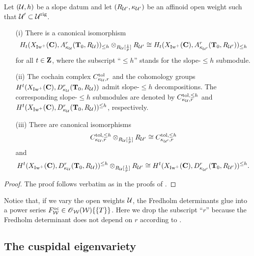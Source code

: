 \begin{Proposition}\label{Proposition: functoriality of BS chain complex under slope decomposition} Let $(\calU, h)$ be a slope datum and let $(R_{\calU'}, \kappa_{\calU'})$ be an affinoid open weight such that $\calU' \subset \calU^{\rig}$. 
\begin{enumerate}
    \item[(i)] There is a canonical isomorphism \[
        H_{t}(X_{\Iw^+}(\C), A_{\kappa_{\calU}}^r(\T_0, R_{\calU}))_{\leq h} \otimes_{R_{\calU}[\frac{1}{p}]} R_{\calU'} \cong H_{t}(X_{\Iw^+}(\C), A_{\kappa_{\calU'}}^r(\T_0, R_{\calU'}))_{\leq h}
    \] for all $t\in \Z$, where the subscript ``$\leq h$'' stands for the slope-$\leq h$ submodule.
    \item[(ii)] The cochain complex $C_{\kappa_{\calU}, r}^{\tol}$ and the cohomology groups $H^t(X_{\Iw^+}(\C), D_{\kappa_{\calU}}^r(\T_0, R_{\calU}))$ admit slope-$\leq h$ decompositions. The corresponding slope-$\leq h$ submodules are denoted by $C_{\kappa_{\calU}, r}^{\tol, \leq h}$ and $H^t(X_{\Iw^+}(\C), D_{\kappa_{\calU}}^r(\T_0, R_{\calU}))^{\leq h}$, respectively. 
    \item[(iii)] There are canonical isomorphisms$$
        C_{\kappa_{\calU}, r}^{\tol, \leq h}\otimes_{R_{\calU}[\frac{1}{p}]}R_{\calU'}\cong C_{\kappa_{\calU'}, r}^{\tol, \leq h}$$
        and 
        $$ H^t(X_{\Iw^+}(\C), D_{\kappa_{\calU}}^r(\T_0, R_{\calU}))^{\leq h}\otimes_{R_{\calU}[\frac{1}{p}]}R_{\calU'} \cong H^t(X_{\Iw^+}(\C), D_{\kappa_{\calU'}}^r(\T_0, R_{\calU'}))^{\leq h}.$$
\end{enumerate}
\end{Proposition}
\begin{proof}
The proof follows verbatim as in the proofs of \cite[Proposition 3.3 \& Proposition 3.4]{CHJ-2017}.
\end{proof}

Notice that, if we vary the open weights $\calU$, the Fredholm determinants glue into a power series $F_{\calW}^{\oc}\in \scrO_{\calW}(\calW)\{\{T\}\}$. Here we drop the subscript ``$r$'' because the Fredholm determinant does not depend on $r$ according to \cite[Proposition 3.1.1]{Hansen-PhD}. 


\subsection{The cuspidal eigenvariety}\label{subsection: cuspidal eigenvariety}
